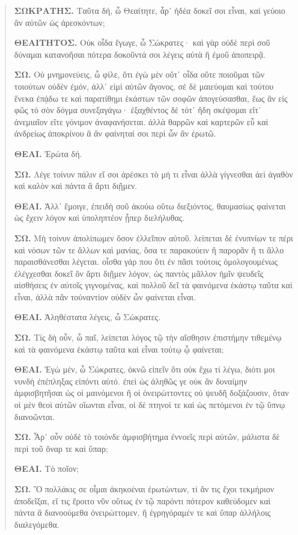 \begin{quote}
{\g\textbf{ΣΩΚΡΑΤΗΣ.} Ταῦτα δή, ὦ Θεαίτητε, ἆρ᾽ ἡδέα δοκεῖ σοι εἶναι, καὶ γεύοιο ἂν αὐτῶν ὡς ἀρεσκόντων;

\textbf{ΘΕΑΙΤΗΤΟΣ.} Οὐκ οἶδα ἔγωγε, ὦ Σώκρατες· καὶ γὰρ οὐδὲ περὶ σοῦ δύναμαι κατανοῆσαι πότερα δοκοῦντά σοι λέγεις αὐτὰ ἢ ἐμοῦ ἀποπειρᾷ.

\textbf{ΣΩ.} Οὐ μνημονεύεις, ὦ φίλε, ὅτι ἐγὼ μὲν οὔτ᾽ οἶδα οὔτε ποιοῦμαι τῶν τοιούτων οὐδὲν ἐμόν, ἀλλ᾽ εἰμὶ αὐτῶν ἄγονος, σὲ δὲ μαιεύομαι καὶ τούτου ἕνεκα ἐπᾴδω τε καὶ παρατίθημι ἑκάστων τῶν σοφῶν ἀπογεύσασθαι, ἕως ἂν εἰς φῶς τὸ σὸν δόγμα συνεξαγάγω· ἐξαχθέντος δὲ τότ᾽ ἤδη σκέψομαι εἴτ᾽ ἀνεμιαῖον εἴτε γόνιμον ἀναφανήσεται. ἀλλὰ θαρρῶν καὶ καρτερῶν εὖ καὶ ἀνδρείως ἀποκρίνου ἃ ἂν φαίνηταί σοι περὶ ὧν ἂν ἐρωτῶ.

\textbf{ΘΕΑΙ.} Ἐρώτα δή.

\textbf{ΣΩ.} Λέγε τοίνυν πάλιν εἴ σοι ἀρέσκει τὸ μή τι εἶναι ἀλλὰ γίγνεσθαι ἀεὶ ἀγαθὸν καὶ καλὸν καὶ πάντα ἃ ἄρτι διῇμεν.

\textbf{ΘΕΑΙ.} Ἀλλ᾽ ἔμοιγε, ἐπειδὴ σοῦ ἀκούω οὕτω διεξιόντος, θαυμασίως φαίνεται ὡς ἔχειν λόγον καὶ ὑποληπτέον ᾗπερ διελήλυθας.

\textbf{ΣΩ.} Μὴ τοίνυν ἀπολίπωμεν ὅσον ἐλλεῖπον αὐτοῦ. λείπεται δὲ ἐνυπνίων τε πέρι καὶ νόσων τῶν τε ἄλλων καὶ μανίας, ὅσα τε παρακούειν ἢ παρορᾶν ἤ τι ἄλλο παραισθάνεσθαι λέγεται. οἶσθα γάρ που ὅτι ἐν πᾶσι τούτοις ὁμολογουμένως ἐλέγχεσθαι δοκεῖ ὃν ἄρτι διῇμεν λόγον, ὡς παντὸς μᾶλλον ἡμῖν ψευδεῖς αἰσθήσεις ἐν αὐτοῖς γιγνομένας, καὶ πολλοῦ δεῖ τὰ φαινόμενα ἑκάστῳ ταῦτα καὶ εἶναι, ἀλλὰ πᾶν τοὐναντίον οὐδὲν ὧν φαίνεται εἶναι.

\textbf{ΘΕΑΙ.} Ἀληθέστατα λέγεις, ὦ Σώκρατες.

\textbf{ΣΩ.} Τίς δὴ οὖν, ὦ παῖ, λείπεται λόγος τῷ τὴν αἴσθησιν ἐπιστήμην τιθεμένῳ καὶ τὰ φαινόμενα ἑκάστῳ ταῦτα καὶ εἶναι τούτῳ ᾧ φαίνεται;

\textbf{ΘΕΑΙ.} Ἐγὼ μέν, ὦ Σώκρατες, ὀκνῶ εἰπεῖν ὅτι οὐκ ἔχω τί λέγω, διότι μοι νυνδὴ ἐπέπληξας εἰπόντι αὐτό. ἐπεὶ ὡς ἀληθῶς γε οὐκ ἂν δυναίμην ἀμφισβητῆσαι ὡς οἱ μαινόμενοι ἢ οἱ ὀνειρώττοντες οὐ ψευδῆ δοξάζουσιν, ὅταν οἱ μὲν θεοὶ αὐτῶν οἴωνται εἶναι, οἱ δὲ πτηνοί τε καὶ ὡς πετόμενοι ἐν τῷ ὕπνῳ διανοῶνται.

\textbf{ΣΩ.} Ἆρ᾽ οὖν οὐδὲ τὸ τοιόνδε ἀμφισβήτημα ἐννοεῖς περὶ αὐτῶν, μάλιστα δὲ περὶ τοῦ ὄναρ τε καὶ ὕπαρ;

\textbf{ΘΕΑΙ.} Τὸ ποῖον;

\textbf{ΣΩ.} Ὃ πολλάκις σε οἶμαι ἀκηκοέναι ἐρωτώντων, τί ἄν τις ἔχοι τεκμήριον ἀποδεῖξαι, εἴ τις ἔροιτο νῦν οὕτως ἐν τῷ παρόντι πότερον καθεύδομεν καὶ πάντα ἃ διανοούμεθα ὀνειρώττομεν, ἢ ἐγρηγόραμέν τε καὶ ὕπαρ ἀλλήλοις διαλεγόμεθα.

}
\end{quote}
